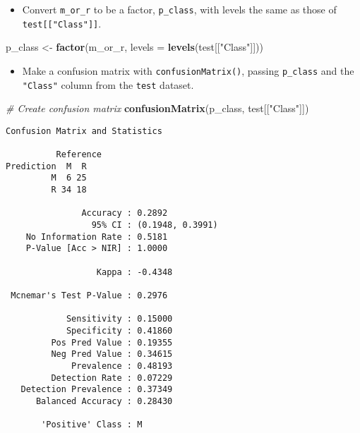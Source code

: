\documentclass[
]{book}
\newenvironment{Shaded}{\begin{snugshade}}{\end{snugshade}}
\newcommand{\CommentTok}[1]{\textcolor[rgb]{0.56,0.35,0.01}{\textit{#1}}}
\newcommand{\DataTypeTok}[1]{\textcolor[rgb]{0.13,0.29,0.53}{#1}}
\newcommand{\KeywordTok}[1]{\textcolor[rgb]{0.13,0.29,0.53}{\textbf{#1}}}
\newcommand{\NormalTok}[1]{#1}
\newcommand{\StringTok}[1]{\textcolor[rgb]{0.31,0.60,0.02}{#1}}
\providecommand{\tightlist}{%
  \setlength{\itemsep}{0pt}\setlength{\parskip}{0pt}}
\begin{document}
\begin{itemize}
\tightlist
\item
  Convert \texttt{m\_or\_r} to be a factor, \texttt{p\_class}, with levels the same as those of \texttt{test{[}{[}"Class"{]}{]}}.
\end{itemize}

\begin{Shaded}
\begin{Highlighting}[]
\NormalTok{p_class <-}\StringTok{ }\KeywordTok{factor}\NormalTok{(m_or_r, }\DataTypeTok{levels =} \KeywordTok{levels}\NormalTok{(test[[}\StringTok{"Class"}\NormalTok{]]))}
\end{Highlighting}
\end{Shaded}

\begin{itemize}
\tightlist
\item
  Make a confusion matrix with \texttt{confusionMatrix()}, passing \texttt{p\_class} and the \texttt{"Class"} column from the \texttt{test} dataset.
\end{itemize}

\begin{Shaded}
\begin{Highlighting}[]
\CommentTok{# Create confusion matrix}
\KeywordTok{confusionMatrix}\NormalTok{(p_class, test[[}\StringTok{"Class"}\NormalTok{]])}
\end{Highlighting}
\end{Shaded}

\begin{verbatim}
Confusion Matrix and Statistics

          Reference
Prediction  M  R
         M  6 25
         R 34 18
                                          
               Accuracy : 0.2892          
                 95% CI : (0.1948, 0.3991)
    No Information Rate : 0.5181          
    P-Value [Acc > NIR] : 1.0000          
                                          
                  Kappa : -0.4348         
                                          
 Mcnemar's Test P-Value : 0.2976          
                                          
            Sensitivity : 0.15000         
            Specificity : 0.41860         
         Pos Pred Value : 0.19355         
         Neg Pred Value : 0.34615         
             Prevalence : 0.48193         
         Detection Rate : 0.07229         
   Detection Prevalence : 0.37349         
      Balanced Accuracy : 0.28430         
                                          
       'Positive' Class : M               
                                          
\end{verbatim}
\end{document}

